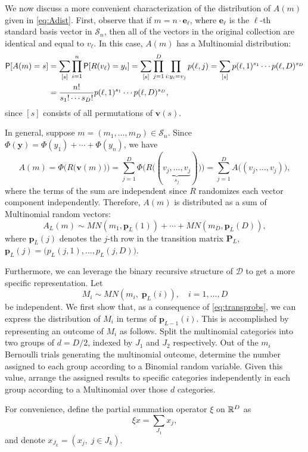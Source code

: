 \documentclass[11pt,draft]{article}
\newcommand{\Dsp}{\mathcal{D}}
\newcommand{\Ssp}{\mathcal{S}}
\newcommand{\yv}{\mathbf{y}}
\newcommand{\ev}{\mathbf{e}}
\newcommand{\vv}{\mathbf{v}}
\newcommand{\pv}{\mathbf{p}}
\newcommand{\Pm}{\mathbf{P}}
\begin{document}

We now discuss a more convenient characterization of the distribution of $A(m)$
given in \eqref{eq:Adist}.
First, observe that if $m = n\cdot \ev_\ell$, where $\ev_\ell$ is the $\ell$-th
standard basis vector in $\Ssp_n$, then all of the vectors in the original
collection are identical and equal to $v_\ell$.
In this case, $A(m)$ has a Multinomial distribution:
\begin{align*}
\P[A(m) = s] &= \sum_{[s]} \prod_{i=1}^n \P[R(v_\ell) = y_i] =
\sum_{[s]} \prod_{j = 1}^D\prod_{i: y_i = v_j} p(\ell, j) =
\sum_{[s]} p(\ell, 1)^{s_1}\cdots p(\ell, D)^{s_D} \\
&= \frac{n!}{s_1!\cdots s_D!} p(\ell, 1)^{s_1}\cdots p(\ell, D)^{s_D},
\end{align*}
since $[s]$ consists of all permutations of $\vv(s)$.

In general, suppose $m = (m_1,\dots,m_D)\in\Ssp_n$.
Since $\Phi(\yv) = \Phi(y_1) + \cdots + \Phi(y_n)$, we have
\[ A(m) = \Phi\big(R\big(\vv(m)\big)\big) =
\sum_{j=1}^D \Phi\big(R\big((\underbrace{v_j,\dots,v_j}_{s_j})\big)\big) =
\sum_{j=1}^D A\big((v_j,\dots,v_j)\big), \]
where the terms of the sum are independent since $R$ randomizes each vector
component independently.
Therefore, $A(m)$ is distributed as a sum of Multinomial random vectors:
\begin{equation} \label{eq:Adistmn}
A_L(m) \sim MN(m_1, \pv_L(1)) + \cdots + MN(m_D, \pv_L(D)),
\end{equation}
where $\pv_L(j)$ denotes the $j$-th row in the transition matrix
$\Pm_L$, \ie $\pv_L(j) = \big(p_L(j,1),\dots,p_L(j,D)\big)$.

Furthermore, we can leverage the binary recursive structure of $\Dsp$ to get a
more specific representation.
Let
\[ M_i \sim MN(m_i,\; \pv_L(i)), \quad i = 1,\dots,D \]
be independent.
We first show that, as a consequence of \eqref{eq:transprobs}, we can express
the distribution of $M_i$ in terms of $\pv_{L-1}(i)$.
This is accomplished by representing an outcome of $M_i$ as follows.
Split the multinomial categories into two groups of $d = D/2$, indexed by $J_1$
and $J_2$ respectively.
Out of the $m_i$ Bernoulli trials generating the multinomial outcome, determine
the number assigned to each group according to a Binomial random variable.
Given this value, arrange the assigned results to specific categories
independently in each group according to a Multinomial over those $d$
categories.

For convenience, define the partial summation operator $\xi$ on $\R^D$ as
\[ \xi x = \sum_{J_1} x_j, \]
and denote $x_{J_k} = (x_j,\; j \in J_k)$.
\end{document}
